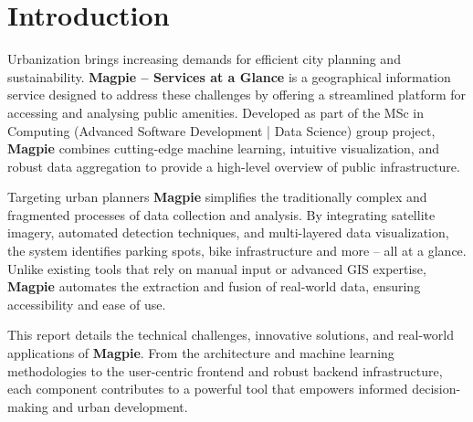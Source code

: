 \section*{Introduction}

Urbanization brings increasing demands for efficient city planning and
sustainability. \textbf{Magpie – Services at a Glance} is a geographical
information service designed to address these challenges by offering a
streamlined platform for accessing and analysing public amenities. Developed as
part of the MSc in Computing (Advanced Software Development | Data Science)
group project, \textbf{Magpie} combines cutting-edge machine learning, intuitive
visualization, and robust data aggregation to provide a high-level overview of
public infrastructure.

Targeting urban planners \textbf{Magpie} simplifies the traditionally complex
and fragmented processes of data collection and analysis. By integrating
satellite imagery, automated detection techniques, and multi-layered data
visualization, the system identifies parking spots, bike infrastructure and more
-- all at a glance. Unlike existing tools that rely on manual input or advanced
GIS expertise, \textbf{Magpie} automates the extraction and fusion of real-world
data, ensuring accessibility and ease of use.

This report details the technical challenges, innovative solutions, and
real-world applications of \textbf{Magpie}. From the architecture and machine
learning methodologies to the user-centric frontend and robust backend
infrastructure, each component contributes to a powerful tool that empowers
informed decision-making and urban development.
